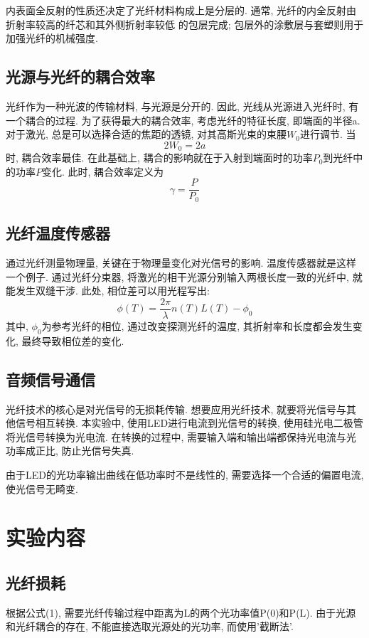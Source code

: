 \documentclass[12pt,a4paper]{article}
\begin{document}
内表面全反射的性质还决定了光纤材料构成上是分层的. 通常, 光纤的内全反射由折射率较高的纤芯和其外侧折射率较低
的包层完成; 包层外的涂敷层与套塑则用于加强光纤的机械强度.
\subsection{光源与光纤的耦合效率}
光纤作为一种光波的传输材料, 与光源是分开的. 因此, 光线从光源进入光纤时, 有一个耦合的过程. 
为了获得最大的耦合效率, 考虑光纤的特征长度, 即端面的半径a. 对于激光, 总是可以选择合适的焦距的透镜, 对其高斯光束的束腰$W_0$进行调节. 
当$$2W_0=2a$$时, 耦合效率最佳. 在此基础上, 耦合的影响就在于入射到端面时的功率$P_0$到光纤中的功率$P$变化. 此时, 耦合效率定义为
$$\gamma=\frac{P}{P_0}$$

\subsection{光纤温度传感器}
通过光纤测量物理量, 关键在于物理量变化对光信号的影响. 温度传感器就是这样一个例子. 通过光纤分束器, 将激光的相干光源分别输入两根长度一致的光纤中, 就能发生双缝干涉. 
此处, 相位差可以用光程写出:
\begin{equation}
    \phi(T)=\frac{2\pi}{\lambda}n(T)L(T)-\phi_0
\end{equation}
其中, $\phi_0$为参考光纤的相位, 通过改变探测光纤的温度, 其折射率和长度都会发生变化, 最终导致相位差的变化. 

\subsection{音频信号通信}
光纤技术的核心是对光信号的无损耗传输. 想要应用光纤技术, 就要将光信号与其他信号相互转换. 
本实验中, 使用LED进行电流到光信号的转换, 使用硅光电二极管将光信号转换为光电流. 在转换的过程中, 需要输入端和输出端都保持光电流与光功率成正比, 
防止光信号失真. 

由于LED的光功率输出曲线在低功率时不是线性的, 需要选择一个合适的偏置电流, 使光信号无畸变.

\section{实验内容}
\subsection{光纤损耗}
根据公式(1), 需要光纤传输过程中距离为L的两个光功率值P(0)和P(L). 由于光源和光纤耦合的存在, 不能直接选取光源处的光功率, 而使用'截断法'.
\end{document}
